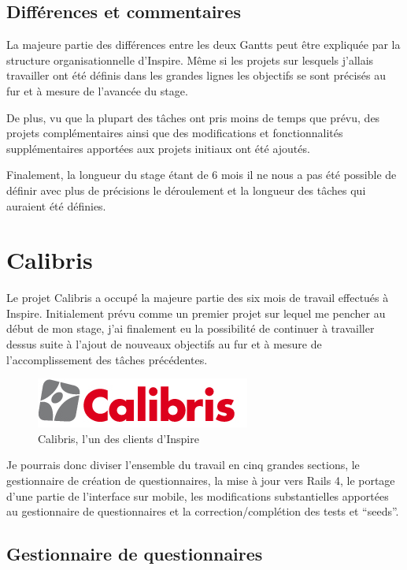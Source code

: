 \documentclass[12pt,a4paper]{book}
\begin{document}
\subsection{Différences et commentaires}

La majeure partie des différences entre les deux Gantts peut être expliquée par la structure organisationnelle d'Inspire. Même si les projets sur lesquels j'allais travailler ont été définis dans les grandes lignes les objectifs se sont précisés au fur et à mesure de l'avancée du stage.

De plus, vu que la plupart des tâches ont pris moins de temps que prévu, des projets complémentaires ainsi que des modifications et fonctionnalités supplémentaires apportées aux projets initiaux ont été ajoutés.

Finalement, la longueur du stage étant de 6 mois il ne nous a pas été possible de définir avec plus de précisions le déroulement et la longueur des tâches qui auraient été définies.

\section{Calibris}

Le projet Calibris a occupé la majeure partie des six mois de travail effectués à Inspire. Initialement prévu comme un premier projet sur lequel me pencher au début de mon stage, j'ai finalement eu la possibilité de continuer à travailler dessus suite à l'ajout de nouveaux objectifs au fur et à mesure de l'accomplissement des tâches précédentes.

\begin{figure}[htp]
\centering
\includegraphics[scale=.60]{img/calibris.jpg}
 \caption{Calibris, l'un des clients d'Inspire}
 \label{fig.jira_agile1}
\end{figure}

Je pourrais donc diviser l'ensemble du travail en cinq grandes sections, le gestionnaire de création de questionnaires, la mise à jour vers Rails 4, le portage d'une partie de l'interface sur mobile, les modifications substantielles apportées au gestionnaire de questionnaires et la correction/complétion des tests et ``seeds''.

\subsection{Gestionnaire de questionnaires}
\end{document}
